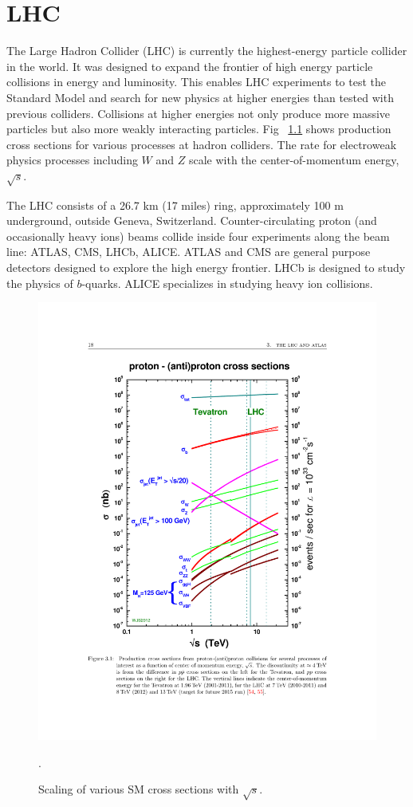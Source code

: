 \label{ch:detector}
\chapter{LHC}
The Large Hadron Collider (LHC) is currently the highest-energy particle collider in the world. It was designed to expand the frontier of high energy particle collisions in energy and luminosity. This enables LHC experiments to test the Standard Model and search for new physics at higher energies than tested with previous colliders. Collisions at higher energies not only produce more massive particles but also more weakly interacting particles. Fig ~\ref{fig:xs_scaling} shows production cross sections for various processes at hadron colliders. The rate for electroweak physics processes including $W$ and $Z$ scale with the center-of-momentum energy, $\sqrt{s}$.

The LHC consists of a 26.7 km (17 miles) ring, approximately 100 m underground, outside Geneva, Switzerland. Counter-circulating proton (and occasionally heavy ions) beams collide inside four experiments along the beam line: ATLAS, CMS, LHCb, ALICE. ATLAS and CMS are general purpose detectors designed to explore the high energy frontier. LHCb is designed to study the physics of $b$-quarks. ALICE specializes in studying heavy ion collisions. 


\begin{figure}[h!]
  \centering
  \includegraphics[width=\hsize]{figures/Detector/xs_scaling.pdf}
  \caption{Scaling of various SM cross sections with $\sqrt{s}$.}. 
  \label{fig:xs_scaling}
\end{figure}
\FloatBarrier



